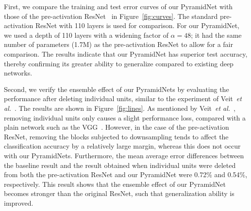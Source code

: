 \documentclass[10pt,twocolumn,letterpaper]{article}
\begin{document}
First, we compare the training and test error curves of our PyramidNet with those of the pre-activation ResNet~\cite{preresnet} in Figure~\ref{fig:curves}. The standard pre-activation ResNet with 110 layers is used for comparison. For our PyramidNet, we used a depth of 110 layers with a widening factor of $\alpha=48$; it had the same number of parameters (1.7M) as the pre-activation ResNet to allow for a fair comparison. The results indicate that our PyramidNet has superior test accuracy, thereby confirming its greater ability to generalize compared to existing deep networks.

Second, we verify the ensemble effect of our PyramidNets by evaluating the performance after deleting individual units, similar to the experiment of Veit~{\it et al.}~\cite{ensemble}. The results are shown in Figure~\ref{fig:lines}. As mentioned by Veit~{\it et al.}~\cite{ensemble}, removing individual units only causes a slight performance loss, compared with a plain network such as the VGG~\cite{VGG}. However, in the case of the pre-activation ResNet, removing the blocks subjected to downsampling tends to affect the classification accuracy by a relatively large margin, whereas this does not occur with our PyramidNets. Furthermore, the mean average error differences between the baseline result and the result obtained when individual units were deleted from both the pre-activation ResNet and our PyramidNet were 0.72\% and 0.54\%, respectively. This result shows that the ensemble effect of our PyramidNet becomes stronger than the original ResNet, such that generalization ability is improved.
\end{document}
